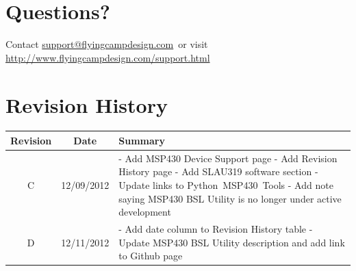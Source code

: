 \documentclass[10pt,letterpaper]{datasheet}
\makeatletter
\newcommand{\fcdsupportemail}{\href{mailto:support@flyingcampdesign.com}{support@flyingcampdesign.com}}
\newcommand{\fcdsupporturl}{\href{http://www.flyingcampdesign.com/support.html}{http://www.flyingcampdesign.com/support.html}}
\newcommand{\pmt}{Python~MSP430~Tools}
\makeatother
\begin{document}
\newpage

\section*{Questions?}
Contact \fcdsupportemail\ or visit \fcdsupporturl

\newpage

\section*{Revision History}
\label{tab:revision-history}
\begin{tabularx}{\textwidth}{|c|c|X|}
  \hline
  Revision &
  Date &
  Summary \\
  \hline
  C & 12/09/2012 & - Add MSP430 Device Support page \newline %
                   - Add Revision History page \newline %
                   - Add SLAU319 software section \newline %
                   - Update links to \pmt \newline %
                   - Add note saying MSP430 BSL Utility is no longer under active development \\
  \hline
  D & 12/11/2012 & - Add date column to Revision History table \newline %
                   - Update MSP430 BSL Utility description and add link to Github page \\
  \hline
\end{tabularx}

\newpage


\end{document}
